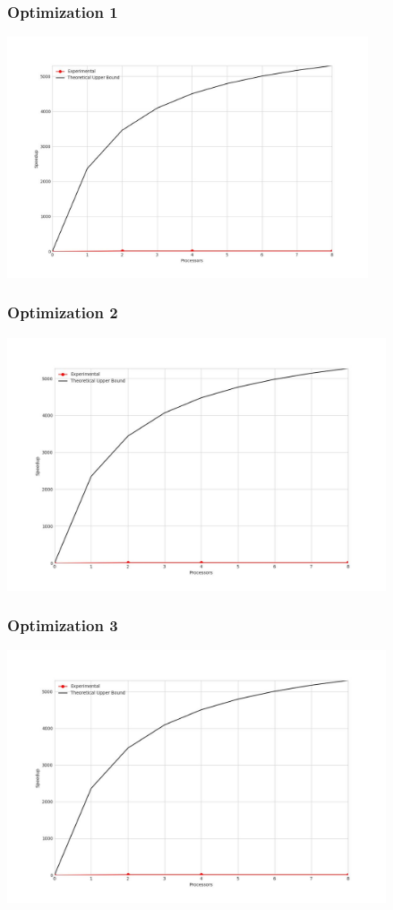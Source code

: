 \subsubsection{Optimization 1}
\begin{center}
    \resizebox{0.95\textwidth}{!}{}
    \includegraphics[width=0.8\textwidth]{../img/speedup-graph_type-tile-820000-O1}
\end{center}

\clearpage
\subsubsection{Optimization 2}
\begin{center}
    \resizebox{0.95\textwidth}{!}{}
    \includegraphics[width=0.84\textwidth]{../img/speedup-graph_type-tile-820000-O2}
\end{center}

\subsubsection{Optimization 3}
\begin{center}
    \resizebox{0.95\textwidth}{!}{}
    \includegraphics[width=0.84\textwidth]{../img/speedup-graph_type-tile-820000-O3}
\end{center}
